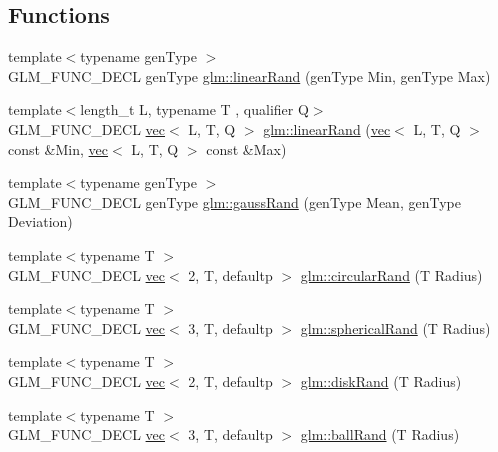 \subsection*{Functions}
\begin{DoxyCompactItemize}
\item 
{\footnotesize template$<$typename gen\+Type $>$ }\\G\+L\+M\+\_\+\+F\+U\+N\+C\+\_\+\+D\+E\+CL gen\+Type \hyperlink{group__gtc__random_ga04e241ab88374a477a2c2ceadd2fa03d}{glm\+::linear\+Rand} (gen\+Type Min, gen\+Type Max)
\item 
{\footnotesize template$<$length\+\_\+t L, typename T , qualifier Q$>$ }\\G\+L\+M\+\_\+\+F\+U\+N\+C\+\_\+\+D\+E\+CL \hyperlink{structglm_1_1vec}{vec}$<$ L, T, Q $>$ \hyperlink{group__gtc__random_ga94731130c298a9ff5e5025fdee6d97a0}{glm\+::linear\+Rand} (\hyperlink{structglm_1_1vec}{vec}$<$ L, T, Q $>$ const \&Min, \hyperlink{structglm_1_1vec}{vec}$<$ L, T, Q $>$ const \&Max)
\item 
{\footnotesize template$<$typename gen\+Type $>$ }\\G\+L\+M\+\_\+\+F\+U\+N\+C\+\_\+\+D\+E\+CL gen\+Type \hyperlink{group__gtc__random_ga5193a83e49e4fdc5652c084711083574}{glm\+::gauss\+Rand} (gen\+Type Mean, gen\+Type Deviation)
\item 
{\footnotesize template$<$typename T $>$ }\\G\+L\+M\+\_\+\+F\+U\+N\+C\+\_\+\+D\+E\+CL \hyperlink{structglm_1_1vec}{vec}$<$ 2, T, defaultp $>$ \hyperlink{group__gtc__random_ga9dd05c36025088fae25b97c869e88517}{glm\+::circular\+Rand} (T Radius)
\item 
{\footnotesize template$<$typename T $>$ }\\G\+L\+M\+\_\+\+F\+U\+N\+C\+\_\+\+D\+E\+CL \hyperlink{structglm_1_1vec}{vec}$<$ 3, T, defaultp $>$ \hyperlink{group__gtc__random_ga22f90fcaccdf001c516ca90f6428e138}{glm\+::spherical\+Rand} (T Radius)
\item 
{\footnotesize template$<$typename T $>$ }\\G\+L\+M\+\_\+\+F\+U\+N\+C\+\_\+\+D\+E\+CL \hyperlink{structglm_1_1vec}{vec}$<$ 2, T, defaultp $>$ \hyperlink{group__gtc__random_gaa0b18071f3f97dbf8bcf6f53c6fe5f73}{glm\+::disk\+Rand} (T Radius)
\item 
{\footnotesize template$<$typename T $>$ }\\G\+L\+M\+\_\+\+F\+U\+N\+C\+\_\+\+D\+E\+CL \hyperlink{structglm_1_1vec}{vec}$<$ 3, T, defaultp $>$ \hyperlink{group__gtc__random_ga7c53b7797f3147af68a11c767679fa3f}{glm\+::ball\+Rand} (T Radius)
\end{DoxyCompactItemize}


